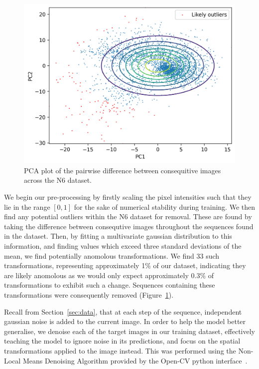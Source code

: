 \documentclass[twocolumn]{article}
\begin{document}
\begin{figure}
    \centering
    \includegraphics[scale=0.4]{assets/change-mag.png}
    \caption{PCA plot of the pairwise difference between consequitive images across the N6 dataset.}
    \label{fig:change}
\end{figure}

We begin our pre-processing by firstly scaling the pixel intensities such that they lie in the range $[0, 1]$ for the sake of numerical stability during training. We then find any potential outliers within the N6 dataset for removal. These are found by taking the difference between consequtive images throughout the sequences found in the dataset. Then, by fitting a multivariate gaussian distribution to this information, and finding values which exceed three standard deviations of the mean, we find potentially anomolous transformations. We find 33 such transformations, representing approximately 1\% of our dataset, indicating they are likely anomolous as we would only expect approximately 0.3\% of transformations to exhibit such a change. Sequences containing these transformations were consequently removed (Figure~\ref{fig:change}).

Recall from Section~\ref{sec:data}, that at each step of the sequence, independent gaussian noise is added to the current image. In order to help the model better generalise, we denoise each of the target images in our training dataset, effectively teaching the model to ignore noise in its predictions, and focus on the spatial transformations applied to the image instead. This was performed using the Non-Local Means Denoising Algorithm\cite{buades2005non} provided by the Open-CV python interface~\cite{opencv_library}. 
\end{document}
